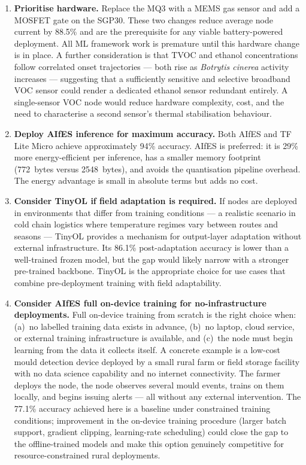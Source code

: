 \begin{enumerate}
    \item \textbf{Prioritise hardware.} Replace the MQ3 with a MEMS gas sensor and add a MOSFET gate on the SGP30. These two changes reduce average node current by 88.5\% and are the prerequisite for any viable battery-powered deployment. All ML framework work is premature until this hardware change is in place. A further consideration is that TVOC and ethanol concentrations follow correlated onset trajectories --- both rise as \textit{Botrytis cinerea} activity increases --- suggesting that a sufficiently sensitive and selective broadband VOC sensor could render a dedicated ethanol sensor redundant entirely. A single-sensor VOC node would reduce hardware complexity, cost, and the need to characterise a second sensor's thermal stabilisation behaviour.
    \item \textbf{Deploy AIfES inference for maximum accuracy.} Both AIfES and TF Lite Micro achieve approximately 94\% accuracy. AIfES is preferred: it is 29\% more energy-efficient per inference, has a smaller memory footprint (772~bytes versus 2548~bytes), and avoids the quantisation pipeline overhead. The energy advantage is small in absolute terms but adds no cost.
    \item \textbf{Consider TinyOL if field adaptation is required.} If nodes are deployed in environments that differ from training conditions --- a realistic scenario in cold chain logistics where temperature regimes vary between routes and seasons --- TinyOL provides a mechanism for output-layer adaptation without external infrastructure. Its 86.1\% post-adaptation accuracy is lower than a well-trained frozen model, but the gap would likely narrow with a stronger pre-trained backbone. TinyOL is the appropriate choice for use cases that combine pre-deployment training with field adaptability.
    \item \textbf{Consider AIfES full on-device training for no-infrastructure deployments.} Full on-device training from scratch is the right choice when: (a)~no labelled training data exists in advance, (b)~no laptop, cloud service, or external training infrastructure is available, and (c)~the node must begin learning from the data it collects itself. A concrete example is a low-cost mould detection device deployed by a small rural farm or field storage facility with no data science capability and no internet connectivity. The farmer deploys the node, the node observes several mould events, trains on them locally, and begins issuing alerts --- all without any external intervention. The 77.1\% accuracy achieved here is a baseline under constrained training conditions; improvement in the on-device training procedure (larger batch support, gradient clipping, learning-rate scheduling) could close the gap to the offline-trained models and make this option genuinely competitive for resource-constrained rural deployments.
\end{enumerate}

